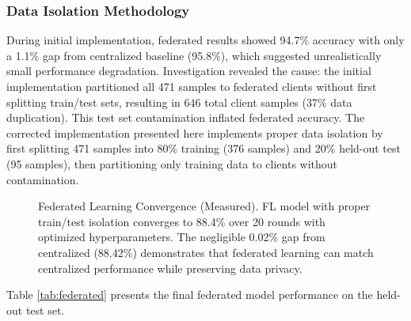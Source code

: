 \documentclass[conference]{IEEEtran}
\begin{document}
\subsubsection{Data Isolation Methodology}

During initial implementation, federated results showed 94.7\% accuracy with only a 1.1\% gap from centralized baseline (95.8\%), which suggested unrealistically small performance degradation. Investigation revealed the cause: the initial implementation partitioned all 471 samples to federated clients without first splitting train/test sets, resulting in 646 total client samples (37\% data duplication). This test set contamination inflated federated accuracy. The corrected implementation presented here implements proper data isolation by first splitting 471 samples into 80\% training (376 samples) and 20\% held-out test (95 samples), then partitioning only training data to clients without contamination.

\begin{figure}[h]
\centering
{}
\caption{Federated Learning Convergence (Measured). FL model with proper train/test isolation converges to 88.4\% over 20 rounds with optimized hyperparameters. The negligible 0.02\% gap from centralized (88.42\%) demonstrates that federated learning can match centralized performance while preserving data privacy.}
\label{fig:fl_convergence}
\end{figure}

Table \ref{tab:federated} presents the final federated model performance on the held-out test set.
\end{document}
